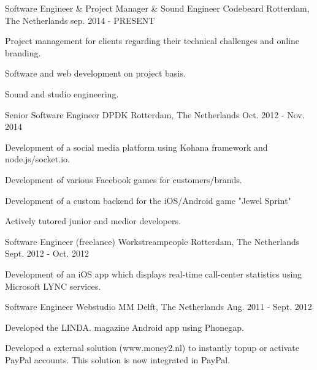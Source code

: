 \begin{cventries}
  \cventry
    {Software Engineer \& Project Manager \& Sound Engineer} %
    {Codebeard} %
    {Rotterdam, The Netherlands} %
    {sep. 2014 - PRESENT} %
    {
      \begin{cvitems} %
        \item {Project management for clients regarding their technical challenges and online branding.}
        \item {Software and web development on project basis.}
        \item {Sound and studio engineering.}
      \end{cvitems}
    }
    
  \cventry
    {Senior Software Engineer} %
    {DPDK} %
    {Rotterdam, The Netherlands} %
    {Oct. 2012 - Nov. 2014} %
    {
      \begin{cvitems} %
        \item {Development of a social media platform using Kohana framework and node.js/socket.io.}
        \item {Development of various Facebook games for customers/brands.}
        \item {Development of a custom backend for the iOS/Android game "Jewel Sprint"}
        \item {Actively tutored junior and medior developers.}
      \end{cvitems}
    }

  \cventry
    {Software Engineer (freelance)} %
    {Workstreampeople} %
    {Rotterdam, The Netherlands} %
    {Sept. 2012 - Oct. 2012} %
    {
      \begin{cvitems} %
        \item {Development of an iOS app which displays real-time call-center statistics using Microsoft LYNC services.}
      \end{cvitems}
    }

  \cventry
    {Software Engineer} %
    {Webstudio MM} %
    {Delft, The Netherlands} %
    {Aug. 2011 - Sept. 2012} %
    {
      \begin{cvitems} %
        \item {Developed the LINDA. magazine Android app using Phonegap.}
        \item {Developed a external solution (www.money2.nl) to instantly topup or activate PayPal accounts. This solution is now integrated in PayPal.}
      \end{cvitems}
    }


\end{cventries}
